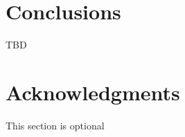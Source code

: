 \documentclass{sig-alternate}
\begin{document}
\section{Conclusions}
TBD

\section{Acknowledgments}
This section is optional

%



  

\appendix
\end{document}
